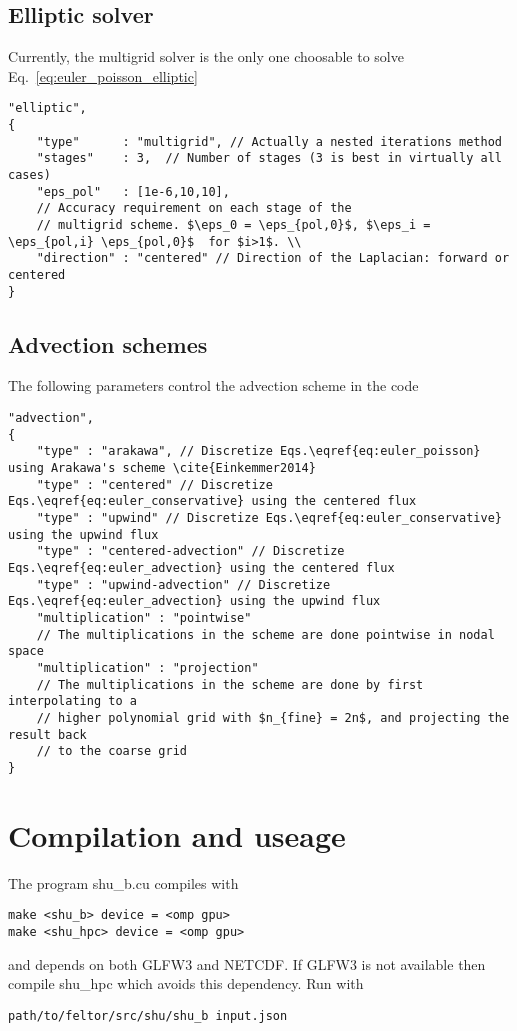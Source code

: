 \subsection{Elliptic solver}
Currently, the multigrid solver is the only one choosable
to solve Eq.~\eqref{eq:euler_poisson_elliptic}
\begin{verbatim}
"elliptic",
{
    "type"      : "multigrid", // Actually a nested iterations method
    "stages"    : 3,  // Number of stages (3 is best in virtually all cases)
    "eps_pol"   : [1e-6,10,10],
    // Accuracy requirement on each stage of the
    // multigrid scheme. $\eps_0 = \eps_{pol,0}$, $\eps_i = \eps_{pol,i} \eps_{pol,0}$  for $i>1$. \\
    "direction" : "centered" // Direction of the Laplacian: forward or centered
}
\end{verbatim}
\subsection{Advection schemes}
The following parameters control the advection scheme in the code
\begin{verbatim}
"advection",
{
    "type" : "arakawa", // Discretize Eqs.\eqref{eq:euler_poisson} using Arakawa's scheme \cite{Einkemmer2014}
    "type" : "centered" // Discretize Eqs.\eqref{eq:euler_conservative} using the centered flux
    "type" : "upwind" // Discretize Eqs.\eqref{eq:euler_conservative} using the upwind flux
    "type" : "centered-advection" // Discretize Eqs.\eqref{eq:euler_advection} using the centered flux
    "type" : "upwind-advection" // Discretize Eqs.\eqref{eq:euler_advection} using the upwind flux
    "multiplication" : "pointwise"
    // The multiplications in the scheme are done pointwise in nodal space
    "multiplication" : "projection"
    // The multiplications in the scheme are done by first interpolating to a
    // higher polynomial grid with $n_{fine} = 2n$, and projecting the result back
    // to the coarse grid
}
\end{verbatim}

\section{Compilation and useage}
The program shu\_b.cu compiles with
\begin{verbatim}
make <shu_b> device = <omp gpu>
make <shu_hpc> device = <omp gpu>
\end{verbatim}
and depends on both GLFW3 and NETCDF. If GLFW3 is not available then compile shu\_hpc which avoids this dependency.
Run with
\begin{verbatim}
path/to/feltor/src/shu/shu_b input.json
\end{verbatim}

